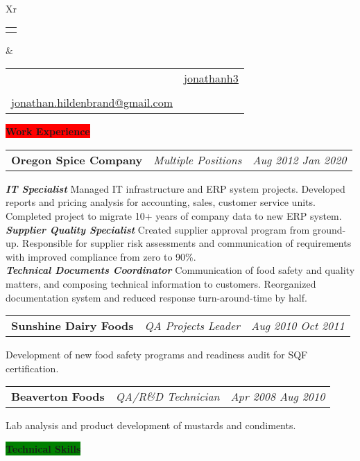 \documentclass[letterpaper,12pt]{article}[leftmargin=*]
\makeatletter
\def\fullname{Jonathan Hildenbrand}
\def\linkedinicon{\faLinkedin}
\def\linkedinlink{https://linkedin.com/in/jonathanh3}
\def\linkedintext{jonathanh3}
\def\phoneicon{\faPhone}
\def\phonetext{+1-971-409-0695}
\def\emailicon{\faEnvelope}
\def\emaillink{mailto:jonathan.hildenbrand+resume@gmail.com}
\def\emailtext{jonathan.hildenbrand@gmail.com}
\def\locationicon{\faMapMarker}
\def\locationtext{Portland, Oregon}
\def\targeticon{\faBinoculars}
\def\targettext{Local \& Remote}
\def\headertype{\doublecol} %
\def\location{\hspace{3pt}\locationicon \hspace{5pt}{\color{links}\locationtext}}
\def\target{\targeticon\hspace{3pt}{\color{links}\targettext}}
\def\phone{\phoneicon\hspace{3pt}{\color{links}{\phonetext}}}
\def\linkedin{\linkedinicon\hspace{3pt}\href{\linkedinlink}{\underline{\linkedintext}}}
\def\email{\emailicon\hspace{3pt}\href{\emaillink}{\underline{\emailtext}}}
\newcommand{\skills}[2]{\vspace{4pt}
  \colorbox{Green}{\color{white}#1\hspace{9pt}\raggedbottom\normalsize\textbf{#2\hspace{4pt}}}
}
\newcommand{\experience}[2]{\vspace{4pt}
  \colorbox{Red}{\color{white}#1\hspace{9pt}\raggedbottom\normalsize\textbf{#2\hspace{4pt}}}
}
\newcommand{\resumeSectionStart}{\begin{itemize}[leftmargin=0.1in]}
\newcommand{\resumeSectionEnd}{\end{itemize}}
\newcommand{\resumeExperience}[3]{
  \vspace{-6pt}
  \item[]
    \begin{tabularx}{0.97\textwidth}{>{\raggedright}X >{\raggedright\arraybackslash}X >{\raggedleft\arraybackslash}X}
      \textbf{\color{primary}#1} & \textit{\color{accent}#2} & \textit{\color{accent}\small#3} \\
  \end{tabularx}
    
}
\newcommand{\doublecol}[6]{
  \begin{tabularx}{\textwidth}{Xr}
    {
      \begin{tabular}[c]{l}
        \fontsize{24}{34}\selectfont{\color{primary}{{\textbf{\fullname}}}}
      \end{tabular}
    } & {
      \begin{tabular}[c]{l@{\hspace{1.5em}} l}
        {\small#4} & {\small#1} \\
        {\small#5} & {\small#2} \\
        {\small#6} & {\small#3}
      \end{tabular}
    }
  \end{tabularx}
}
\newcommand{\singlecol}[6]{
  \begin{tabularx}{\textwidth}{Xr}
    {
      \begin{tabular}[b]{l}
        \fontsize{35}{45}\selectfont{\color{primary}{{\textbf{\fullname}}}} \\
        {\textit{\subtitle}} %
      \end{tabular}
    } & {
      \begin{tabular}[c]{l}
        {\small#1} \\
        {\small#2} \\
        {\small#3} \\
        {\small#4} \\
        {\small#5} \\
        {\small#6}
      \end{tabular}
    }
  \end{tabularx}
}
\makeatother
\begin{document}
\headertype{\linkedin}{\phone}{}{\location}{\target}{\email} %

\experience{\faPieChart}{Work Experience}

\resumeSectionStart{\resumeExperience{Oregon Spice Company}{Multiple Positions}{Aug 2012 \textemdash{} Jan 2020}\textbf{\textit{\color{accent}IT Specialist}} \textemdash{} Managed IT infrastructure and ERP system projects. Developed reports and pricing analysis for accounting, sales, customer service units. Completed project to migrate 10+ years of company data to new ERP system.\\ \textbf{\textit{\color{accent}Supplier Quality Specialist}} \textemdash{} Created supplier approval program from ground-up. Responsible for supplier risk assessments and communication of requirements with improved compliance from zero to 90\%. \\ \textbf{\textit{\color{accent}Technical Documents Coordinator}} \textemdash{} Communication of food safety and quality matters, and composing technical information to customers. Reorganized documentation system and reduced response turn-around-time by half.}\vspace{-6pt}\resumeSectionEnd{}
\resumeSectionStart{\resumeExperience{Sunshine Dairy Foods}{QA Projects Leader}{Aug 2010 \textemdash{} Oct 2011}Development of new food safety programs and readiness audit for SQF certification.}\vspace{-6pt}\resumeSectionEnd{}
\resumeSectionStart{\resumeExperience{Beaverton Foods}{QA/R\&D Technician}{Apr 2008 \textemdash{} Aug 2010}Lab analysis and product development of mustards and condiments.}\vspace{-6pt}\resumeSectionEnd{}

\skills{\faGears}{Technical Skills}
\end{document}
